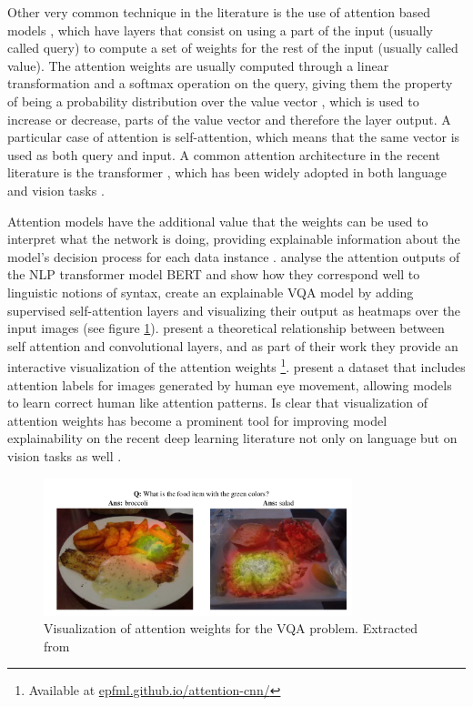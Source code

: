Other very common technique in the literature is the use of attention based models \cite{bahdanau_attention},
which have layers that consist on using a part of the input (usually called query) to compute a set of weights
for the rest of the input (usually called value). The attention weights are usually computed through
a linear transformation and a softmax operation on the query, giving them the property of being a probability
distribution over the value vector \cite{cordonnier_relationship}, which is used to increase or decrease,
parts of the value vector and therefore the layer output. A particular case of attention is
self-attention, which means that the same vector is used as both query and input. A common attention architecture
in the recent literature is the transformer \cite{vaswani_attention}, which has been widely adopted in both
language and vision tasks \cite{devlin_bert, radford_gpt, bello_attention, li_visualbert, carion_object}.

Attention models have the additional value that the weights can be used to interpret what the network is doing, providing
explainable information about the model's decision process for each data instance \cite{wiegreffe_attention}.
 analyse the attention outputs of the NLP transformer model BERT and show how they correspond
well to linguistic notions of syntax,  create an explainable VQA model by adding
supervised self-attention layers and visualizing their output as heatmaps over the input images
(see figure \ref{fig:vqa}).  present a theoretical  relationship between
between self attention and convolutional layers, and as part of their work they provide an interactive visualization
of the attention weights \footnote{Available at \url{epfml.github.io/attention-cnn/}}.  present
a dataset that includes attention labels for images generated by human eye movement, allowing models to learn
correct human like attention patterns. Is clear that visualization of attention weights has become a prominent tool
for improving model explainability on the recent deep learning literature not only on language but on
vision tasks as well \cite{zhang_relation, johnston_depth, carion_object}.



\begin{figure}[ht]
	\begin{center}
	\includegraphics[width=0.8\textwidth]{./figures/soto.png}
	\caption[Attention on VQA]{Visualization of attention weights for the VQA problem. Extracted from  }
	\label{fig:vqa}
	\end{center}
\end{figure}

